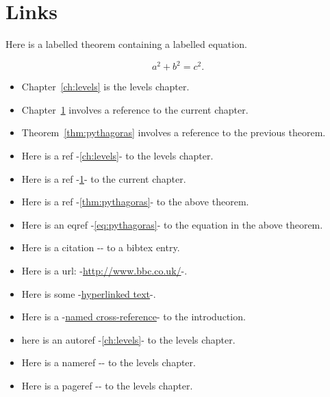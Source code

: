 
\chapter{Links}\label{ch:links}

Here is a labelled theorem containing a labelled equation.
\begin{theorem}\label{thm:pythagoras}
\begin{equation}\label{eq:pythagoras}
a^2 + b^2 = c^2.
\end{equation}
\end{theorem}


\begin{itemize}
\item Chapter~\ref{ch:levels} is the levels chapter.
\item Chapter~\ref{ch:links} involves a reference to the current chapter.
\item Theorem~\ref{thm:pythagoras} involves a reference to the previous theorem.
\item Here is a ref -\ref{ch:levels}- to the levels chapter.
\item Here is a ref -\ref{ch:links}- to the current chapter.
\item Here is a ref -\ref{thm:pythagoras}- to the above theorem.
\item Here is an eqref -\eqref{eq:pythagoras}- to the equation in the above theorem.
\item Here is a citation -\cite{grimmett01}- to a bibtex entry.
\item Here is a url: -\url{http://www.bbc.co.uk/}-.
\item Here is some -\href{http://www.bbc.co.uk/}{hyperlinked text}-.
\item Here is a -\hyperref[ch:intro]{named cross-reference}- to the introduction.
\item here is an autoref -\autoref{ch:levels}- to the levels chapter.
\item Here is a nameref -- to the levels chapter.
\item Here is a pageref -\pageref{ch:levels}- to the levels chapter.
\end{itemize}

